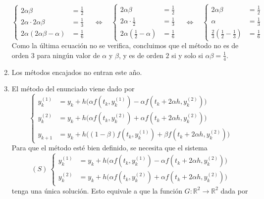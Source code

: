 \documentclass[11pt]{report}
\newcommand{\R}{\mathbb R}
\begin{document}
\begin{enumerate}
    \[\left\{\begin{alignedat}{2}
        2\alpha\beta &=\frac{1}{2} \\[5pt]
        2\alpha \cdot 2\alpha\beta &=\frac{1}{3} \\[5pt]
        2\alpha(2\alpha\beta - \alpha) &= \frac{1}{6}
    \end{alignedat}
    \right. \quad \iff \quad \left\{\begin{alignedat}{2}
        2\alpha\beta &=\frac{1}{2} \\[5pt]
        2\alpha \cdot \frac{1}{2} &=\frac{1}{3} \\[5pt]
        2\alpha\left(\frac{1}{2} - \alpha\right) &= \frac{1}{6}
    \end{alignedat}
    \right. \quad \iff \quad \left\{\begin{alignedat}{2}
        2\alpha\beta &=\frac{1}{2} \\[5pt]
        \alpha &=\frac{1}{3} \\[5pt]
        \frac{2}{3}\left(\frac{1}{2} - \frac{1}{3}\right) &= \frac{1}{6}
    \end{alignedat}
    \right.\]
    Como la última ecuación no se verifica, concluimos que el método no es de orden $3$ para ningún valor de $\alpha$ y $\beta$, y es de orden $2$ si y solo si $\alpha\beta = \frac{1}{4}$.
    \item Los métodos encajados no entran este año.
    \item El método del enunciado viene dado por
    \[\left\{\begin{alignedat}{1}
        y_k^{(1)} &= y_k+h\bigl(\alpha f(t_k,y_k^{(1)}) -\alpha f(t_k+2\alpha h,y_k^{(2)})\bigr)\\
        y_k^{(2)} &= y_k+h\bigl(\alpha f(t_k,y_k^{(2)}) + \alpha f(t_k+2\alpha h, y_k^{(2)})\bigr) \\
        y_{k+1} &= y_k+h\bigl((1-\beta)f(t_k, y_k^{(1)})+\beta f(t_k+2\alpha h, y_k^{(2)})\bigr)
    \end{alignedat}\right.\]
    Para que el método esté bien definido, se necesita que el sistema
    \[(S) \ \left\{\begin{alignedat}{1}
        y_k^{(1)} &= y_k+h\bigl(\alpha f(t_k,y_k^{(1)}) -\alpha f(t_k+2\alpha h,y_k^{(2)})\bigr)\\
        y_k^{(2)} &= y_k+h\bigl(\alpha f(t_k,y_k^{(2)}) + \alpha f(t_k+2\alpha h, y_k^{(2)})\bigr) 
    \end{alignedat}\right.\]
    tenga una única solución. Esto equivale a que la función $G \colon \R^2 \to \R^2$ dada por

\end{enumerate}
\end{document}
